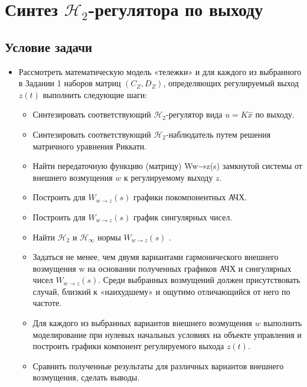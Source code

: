 \chapter{Синтез $\mathcal{H}_2$-регулятора по выходу}
\label{ch:chap3}
\section{Условие задачи}

\begin{itemize}
    \item  Рассмотреть математическую модель «тележки» и для каждого из выбранного в Задании 1 наборов матриц $(C_Z,D_Z)$, 
    определяющих регулируемый выход $z(t)$ выполнить следующие шаги:
    \begin{itemize}
        
        \item Синтезировать соответствующий $\mathcal{H}_2$-регулятор вида $u = K \hat{x}$ по выходу.
        \item Синтезировать соответствующий $\mathcal{H}_2$-наблюдатель путем решения матричного уравнения Риккати.
        \item Найти передаточную функцию (матрицу) Ww→z(s) замкнутой системы от внешнего возмущения $w$ к регулируемому выходу $z$.
       \item Построить для $W_{w\rightarrow z}(s)$ графики покомпонентных АЧХ.
       \item Построить для $W_{w\rightarrow z}(s)$ график сингулярных чисел.
       \item Найти $\mathcal{H}_2$ и $\mathcal{H}_\infty$ нормы  $W_{w\rightarrow z}(s)$ .
       \item Задаться не менее, чем двумя вариантами гармонического внешнего возмущения
        w на основании полученных графиков АЧХ и сингулярных чисел $W_{w\rightarrow z}(s)$. 
        Среди выбранных возмущений должен присутствовать случай, близкий к «наихудшему» и ощутимо отличающийся от него по частоте.
        \item Для каждого из выбранных вариантов внешнего возмущения $w$ выполнить моделирование при нулевых начальных условиях
        на объекте управления и построить графики компонент регулируемого выхода $z(t)$.
        \item Сравнить полученные результаты для различных вариантов внешнего возмущения, сделать выводы.
    \end{itemize}
\end{itemize}

